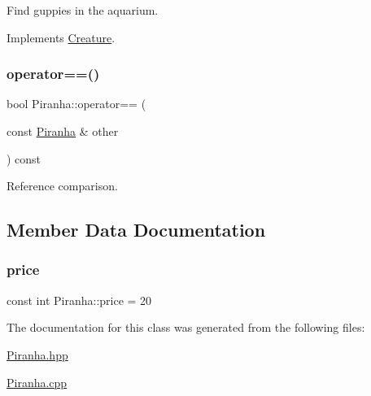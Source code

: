 Find guppies in the aquarium. 



Implements \mbox{\hyperlink{class_creature_a0d531a4c04c1021833ddb0e48864dbf4}{Creature}}.

\mbox{\label{class_piranha_ad374828e737e57a663689f5d54c9cf14}} 
\subsubsection{\texorpdfstring{operator==()}{operator==()}}
{\footnotesize\ttfamily bool Piranha\+::operator== (\begin{DoxyParamCaption}\item[{const \mbox{\hyperlink{class_piranha}{Piranha}} \&}]{other }\end{DoxyParamCaption}) const}



Reference comparison. 



\subsection{Member Data Documentation}
\mbox{\label{class_piranha_a5cab361b7ab7133245dc8a54a1d8addb}} 
\subsubsection{\texorpdfstring{price}{price}}
{\footnotesize\ttfamily const int Piranha\+::price = 20\hspace{0.3cm}{\ttfamily [static]}}



The documentation for this class was generated from the following files\+:\begin{DoxyCompactItemize}
\item 
\mbox{\hyperlink{_piranha_8hpp}{Piranha.\+hpp}}\item 
\mbox{\hyperlink{_piranha_8cpp}{Piranha.\+cpp}}\end{DoxyCompactItemize}
